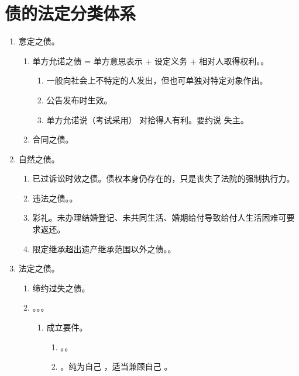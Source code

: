 \section{债的法定分类体系}
\begin{enumerate}
  \item 意定之债。
        \begin{enumerate}
          \item 单方允诺之债 = 单方意思表示 + 设定义务 + 相对人取得权利。。
                \begin{enumerate}
                  \item 一般向社会上不特定的人发出，但也可单独对特定对象作出。
                  \item 公告发布时生效。
                  \item 单方允诺说（考试采用） \yjt 对拾得人有利。要约说 \yjt 失主。
                \end{enumerate}
          \item 合同之债。
        \end{enumerate}
  \item 自然之债。
        \begin{enumerate}
          \item 已过诉讼时效之债。债权本身仍存在的，只是丧失了法院的强制执行力。
          \item 违法之债。。
          \item 彩礼。未办理结婚登记、未共同生活、婚期给付导致给付人生活困难可要求返还。
          \item 限定继承超出遗产继承范围以外之债。。
        \end{enumerate}
  \item 法定之债。
        \begin{enumerate}
          \item 缔约过失之债。
          \item {}。。。
                \begin{enumerate}
                  \item 成立要件。
                        \begin{enumerate}
                          \item {}。。
                          \item {}。纯为自己 \cuo，适当兼顾自己 \dui。

\end{enumerate}
\end{enumerate}
\end{enumerate}
\end{enumerate}
